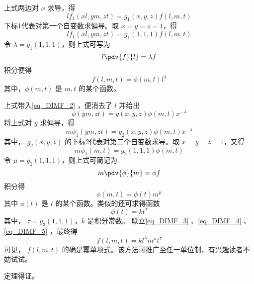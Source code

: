 上式两边对 $x$ 求导，得
\begin{equation}
lf_1(xl,ym,zt)=g_1(x,y,z)f(l,m,t)
\end{equation}
下标1代表对第一个自变数求偏导。取 $x=y=z=1$，得
\begin{equation}
lf_1(xl,ym,zt)=g_1(1,1,1)f(l,m,t)
\end{equation}
令 $\lambda=g_1(1,1,1)$，则上式可写为
\begin{equation}
l\pdv{f}{l}=\lambda f
\end{equation}
积分便得 
\begin{equation}\label{eq_DIMF_3}
f(l,m,t)=\phi(m,t)l^{\lambda}
\end{equation}
其中，$\phi(m,t)$ 是 $m,t$ 的某个函数。

上式带入\autoref{eq_DIMF_2} ，便消去了 $l$ 并给出
\begin{equation}
\phi(ym,zt)=g(x,y,z)\phi(m,t)x^{-\lambda}
\end{equation}
将上式对 $y$ 求偏导，得
\begin{equation}
m\phi_1(ym,zt)=g_2(x,y,z)\phi(m,t)x^{-\lambda}
\end{equation}
其中， $g_2(x,y,z)$ 的下标2代表对第二个自变数求导。取 $x=y=z=1$，又得
\begin{equation}
m\phi_1(m,t)=g_2(1,1,1)\phi(m,t)
\end{equation}
令 $\mu=g_2(1,1,1)$，则上式可简记为
\begin{equation}
m\pdv{\phi}{m}=\phi f
\end{equation}
积分得
\begin{equation}\label{eq_DIMF_4}
\phi(m,t)=\phi(t)m^{\mu}
\end{equation}
其中 $\phi(t)$ 是 $t$ 的某个函数。类似的还可求得函数
\begin{equation}\label{eq_DIMF_5}
\phi(t)=kt^{\tau}
\end{equation}
其中， $\tau=g_3(1,1,1)$，$k$ 是积分常数。
联立\autoref{eq_DIMF_3} 、\autoref{eq_DIMF_4} 、\autoref{eq_DIMF_5} ，最终得
\begin{equation}
f(l,m,t)=kl^{\lambda}m^{\mu}t^{\tau}
\end{equation}
可见， $f(l,m,t)$ 的确是幂单项式。该方法可推广至任一单位制，有兴趣读者不妨试试。

定理得证。

